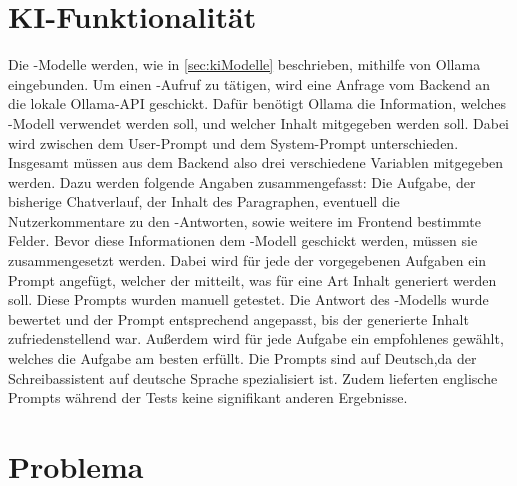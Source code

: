 \documentclass[../main.tex]{subfiles}
\begin{document}
\section{KI-Funktionalität}

Die -Modelle werden, wie in \autoref{sec:kiModelle} beschrieben, mithilfe von Ollama eingebunden. Um einen -Aufruf zu tätigen, wird eine Anfrage vom Backend an die lokale 
Ollama-API geschickt. Dafür benötigt Ollama die Information, welches -Modell verwendet werden soll, und welcher Inhalt mitgegeben werden soll. Dabei wird zwischen dem User-Prompt 
und dem System-Prompt unterschieden. Insgesamt müssen aus dem Backend also drei verschiedene Variablen mitgegeben werden. Dazu werden folgende Angaben zusammengefasst: Die Aufgabe, 
der bisherige Chatverlauf, der Inhalt des Paragraphen, eventuell die Nutzerkommentare zu den -Antworten, sowie weitere im Frontend bestimmte Felder. Bevor diese Informationen dem 
-Modell geschickt werden, müssen sie zusammengesetzt werden. Dabei wird für jede der vorgegebenen Aufgaben ein Prompt angefügt, welcher der  
mitteilt, was für eine Art Inhalt generiert werden soll. Diese Prompts wurden manuell getestet. Die Antwort des -Modells wurde bewertet und der Prompt entsprechend angepasst, bis der generierte Inhalt zufriedenstellend war.
Außerdem wird für jede Aufgabe ein empfohlenes  gewählt, welches die Aufgabe am besten erfüllt. Die Prompts sind auf Deutsch,da der Schreibassistent auf deutsche 
Sprache spezialisiert ist. Zudem lieferten englische Prompts während der Tests keine signifikant anderen Ergebnisse. 

\section{Problema}
\end{document}
